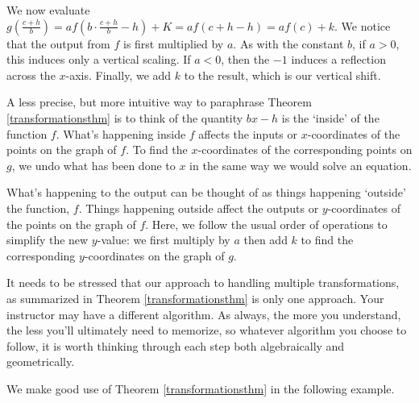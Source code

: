 \documentclass{ximera}
\begin{document}
\smallskip

We now evaluate $g\left( \frac{c+h}{b}\right) = a f\left(b \cdot \frac{c+h}{b} -h \right) + K = a f(c+h-h) =  a f(c)+k$.  We notice that the output from $f$ is first multiplied by $a$.  As with the constant $b$, if $a > 0$, this induces only a vertical scaling.  If $a < 0$, then the $-1$ induces a reflection across the $x$-axis.  Finally, we add $k$ to the result, which is our vertical shift.  

\smallskip

A less precise, but more intuitive way to paraphrase Theorem \ref{transformationsthm} is to think of the quantity $bx-h$ is the `inside' of the function $f$.  What's happening inside $f$ affects the inputs or $x$-coordinates of the points on the graph of $f$.  To find the $x$-coordinates of the corresponding points on $g$, we undo what has been done to $x$ in the same way we would solve an equation.  

\smallskip

What's happening to the output can be thought of as things happening `outside' the function, $f$.  Things happening outside affect the outputs or $y$-coordinates of the points on the graph of $f$.  Here, we follow the usual order of operations to simplify the new $y$-value: we first multiply by $a$ then add $k$ to find the corresponding $y$-coordinates on the graph of $g$.

\smallskip

It needs to be stressed that our approach to handling multiple transformations, as summarized in Theorem \ref{transformationsthm} is only one approach. Your instructor may have a different algorithm.  As always, the more you understand, the less you'll ultimately need to memorize, so whatever algorithm you choose to follow, it is worth thinking through each step both algebraically and geometrically.  

\smallskip

We make good use of Theorem \ref{transformationsthm}  in the following example.
\end{document}
